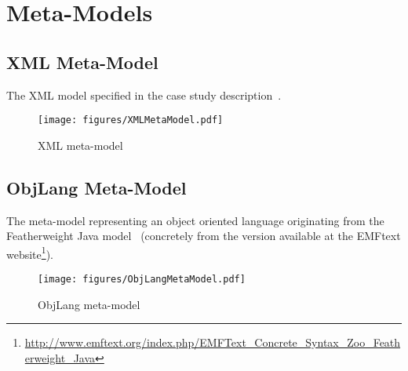 
\section{Meta-Models}
\label{sec:MetaModels}

\enlargethispage{20mm}

\subsection{XML Meta-Model}

The XML model specified in the case study description~\cite{Lano2014}.

\begin{figure}[h!bt]
  \centering
  \texttt{[image: figures/XMLMetaModel.pdf]}
  \caption{XML meta-model}
  \label{fig:XMLMetaModel}
\end{figure}

\subsection{ObjLang Meta-Model}

The meta-model representing an object oriented language originating from the Featherweight Java model~\cite{Igarashi2001} (concretely from the version available at the EMFtext website\footnote{\url{http://www.emftext.org/index.php/EMFText_Concrete_Syntax_Zoo_Featherweight_Java}}).

\begin{figure}[h!bt]
  \centering
  \texttt{[image: figures/ObjLangMetaModel.pdf]}
  \caption{ObjLang meta-model}
  \label{fig:ObjLangMetaModel}
\end{figure}

